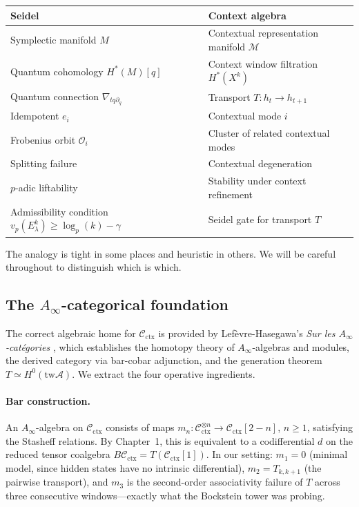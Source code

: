 \documentclass[11pt]{amsart}
\theoremstyle{definition}
\newcommand{\Cctx}{\mathcal{C}_{\!\mathrm{ctx}}}
\newcommand{\vp}{v_p}
\newcommand{\twA}{\mathrm{tw}\mathcal{A}}
\begin{document}
\begin{center}
\renewcommand{\arraystretch}{1.2}
\begin{tabular}{@{}ll@{}}
\toprule
Seidel & Context algebra \\
\midrule
Symplectic manifold $M$ & Contextual representation manifold $\mathcal{M}$ \\
Quantum cohomology $H^*(M)[q]$ & Context window filtration $H^*(X^k)$ \\
Quantum connection $\nabla_{tq\partial_q}$ & Transport $T: h_t \to h_{t+1}$ \\
Idempotent $e_i$ & Contextual mode $i$ \\
Frobenius orbit $\mathcal{O}_i$ & Cluster of related contextual modes \\
Splitting failure & Contextual degeneration \\
$p$-adic liftability & Stability under context refinement \\
Admissibility condition $\vp(E_\lambda^k) \geq \log_p(k) - \gamma$ & Seidel gate for transport $T$ \\
\bottomrule
\end{tabular}
\end{center}

The analogy is tight in some places and heuristic in others.
We will be careful throughout to distinguish which is which.

\subsection{The $A_\infty$-categorical foundation}
\label{sec:ainf-found}

The correct algebraic home for $\Cctx$ is provided by
Lef\`evre-Hasegawa's \emph{Sur les $A_\infty$-cat\'egories} \cite{LFH03},
which establishes the homotopy theory of $A_\infty$-algebras and modules,
the derived category via bar-cobar adjunction, and the generation theorem
$T \simeq H^0(\twA)$.
We extract the four operative ingredients.

\paragraph{Bar construction.}
An $A_\infty$-algebra on $\Cctx$ consists of maps
$m_n: \Cctx^{\otimes n} \to \Cctx[2-n]$, $n \geq 1$, satisfying the
Stasheff relations.
By \cite{LFH03} Chapter~1, this is equivalent to a codifferential $d$
on the reduced tensor coalgebra $B\Cctx = T(\Cctx[1])$.
In our setting: $m_1 = 0$ (minimal model, since hidden states have no
intrinsic differential), $m_2 = T_{k,k+1}$ (the pairwise transport),
and $m_3$ is the second-order associativity failure of $T$
across three consecutive windows---exactly what the Bockstein tower
was probing.
\end{document}
